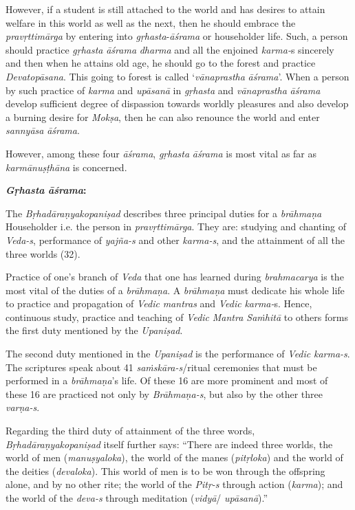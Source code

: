 However, if a student is still attached to the world and has desires to attain welfare in this world as well as the next, then he should embrace the \emph{pravṛttimārga} by entering into \emph{gṛhasta}-\emph{āśrama} or householder life. Such, a person should practice \emph{gṛhasta} \emph{āśrama} \emph{dharma} and all the enjoined \emph{karma-}s sincerely and then when he attains old age, he should go to the forest and practice \emph{Devatopāsana}. This going to forest is called `\emph{vānaprastha} \emph{āśrama}'. When a person by such practice of \emph{karma} and \emph{upāsanā} in \emph{gṛhasta} and \emph{vānaprastha} \emph{āśrama} develop sufficient degree of dispassion towards worldly pleasures and also develop a burning desire for \emph{Mokṣa}, then he can also renounce the world and enter \emph{sannyāsa} \emph{āśrama}.

However, among these four \emph{āśrama}, \emph{gṛhasta} \emph{āśrama} is most vital as far as \emph{karmānuṣṭhāna} is concerned.

\textbf{\emph{Gṛhasta} \emph{āśrama}:}

The \emph{Bṛhadāraṇyakopaniṣad} describes three principal duties for a \emph{brāhmaṇa} Householder i.e. the person in \emph{pravṛttimārga}. They are: studying and chanting of \emph{Veda-s}, performance of \emph{yajña-s} and other \emph{karma-s}, and the attainment of all the three worlds (32).
\eject

Practice of one's branch of \emph{Veda} that one has learned during \emph{brahmacarya} is the most vital of the duties of a \emph{brāhmaṇa}. A \emph{brāhmaṇa} must dedicate his whole life to practice and propagation of \emph{Vedic} \emph{mantras} and \emph{Vedic} \emph{karma-}s. Hence, continuous study, practice and teaching of \emph{Vedic} \emph{Mantra Saṁhitā} to others forms the first duty mentioned by the \emph{Upaniṣad}.

The second duty mentioned in the \emph{Upaniṣad} is the performance of \emph{Vedic} \emph{karma-s}. The scriptures speak about 41 \emph{saṁskāra-s}/ritual ceremonies that must be performed in a \emph{brāhmaṇa}'s life. Of these 16 are more prominent and most of these 16 are practiced not only by \emph{Brāhmaṇa-s}, but also by the other three \emph{varṇa-s}.

Regarding the third duty of attainment of the three words, \emph{Bṛhadā\-raṇya\-kopaniṣad} itself further says: ``There are indeed three worlds, the world of men (\emph{manuṣyaloka}), the world of the manes (\emph{pitṛloka}) and the world of the deities (\emph{devaloka}). This world of men is to be won through the offspring alone, and by no other rite; the world of the \emph{Pitṛ-s} through action (\emph{karma}); and the world of the \emph{deva-s} through meditation (\emph{vidyā}/ \emph{upāsanā}).''

